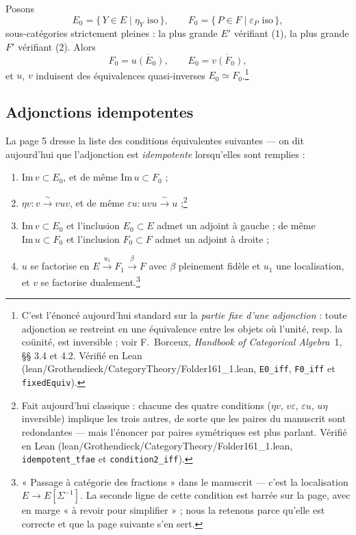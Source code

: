 \documentclass[11pt,a4paper]{article}
\begin{document}
Posons
\[
E_0 = \{\, Y \in E \mid \eta_Y \text{ iso} \,\}, \qquad
F_0 = \{\, P \in F \mid \varepsilon_P \text{ iso} \,\},
\]
sous-catégories strictement pleines : la plus grande $E'$ vérifiant (1), la
plus grande $F'$ vérifiant (2). Alors
\[
F_0 = \overline{u(E_0)}, \qquad E_0 = \overline{v(F_0)},
\]
et $u$, $v$ induisent des équivalences quasi-inverses
$E_0 \simeq F_0$.\footnote{C'est l'énoncé aujourd'hui standard sur la
\emph{partie fixe d'une adjonction} : toute adjonction se restreint en une
équivalence entre les objets où l'unité, resp. la coünité, est inversible ;
voir F.~Borceux, \emph{Handbook of Categorical Algebra}~1, §§ 3.4 et 4.2.
Vérifié en Lean (lean/Grothendieck/CategoryTheory/Folder161\_1.lean, \texttt{E0\_iff},
\texttt{F0\_iff} et \texttt{fixedEquiv}).}

\subsection*{Adjonctions idempotentes}

La page 5 dresse la liste des conditions équivalentes suivantes — on
dit aujourd'hui que l'adjonction est \emph{idempotente} lorsqu'elles sont
remplies :

\begin{enumerate}
\item $\mathrm{Im}\, v \subset E_0$, et de même $\mathrm{Im}\, u \subset F_0$ ;
\item $\eta v : v \xrightarrow{\ \sim\ } vuv$, et de même
$\varepsilon u : uvu \xrightarrow{\ \sim\ } u$ ;\footnote{Fait aujourd'hui
classique : chacune des quatre conditions ($\eta v$, $v\varepsilon$,
$\varepsilon u$, $u\eta$ inversible) implique les trois autres, de sorte
que les paires du manuscrit sont redondantes — mais l'énoncer par paires
symétriques est plus parlant. Vérifié en Lean
(lean/Grothendieck/CategoryTheory/Folder161\_1.lean, \texttt{idempotent\_tfae} et
\texttt{condition2\_iff}).}
\item $\mathrm{Im}\, v \subset E_0$ et l'inclusion $E_0 \subset E$ admet un
adjoint à gauche ; de même $\mathrm{Im}\, u \subset F_0$ et l'inclusion
$F_0 \subset F$ admet un adjoint à droite ;
\item $u$ se factorise en $E \xrightarrow{u_1} F_1 \xrightarrow{\beta} F$
avec $\beta$ pleinement fidèle et $u_1$ une localisation, et $v$ se
factorise dualement.\footnote{« Passage à catégorie des fractions » dans le
manuscrit — c'est la localisation $E \to E[\Sigma^{-1}]$. La seconde ligne
de cette condition est barrée sur la page, avec en marge « à revoir
pour simplifier » ; nous la retenons parce qu'elle est correcte et que la page suivante s'en sert.}
\end{enumerate}
\end{document}
